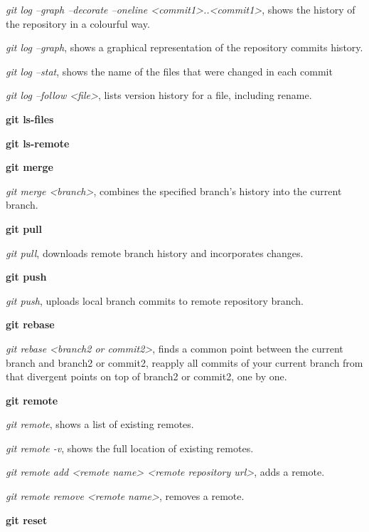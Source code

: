 \begin{refsection}
\noindent\emph{git log --graph --decorate --oneline <commit1>..<commit1>}, shows the history of the repository in a colourful way.

\noindent\emph{git log --graph}, shows a graphical representation of the repository commits history.

\noindent\emph{git log --stat}, shows the name of the files that were changed in each commit

\noindent\emph{git log --follow <file>}, lists version history for a file, including rename.

\vspace*{5mm} \noindent \textbf{git ls-files}

\vspace*{5mm} \noindent \textbf{git ls-remote}

\vspace*{5mm} \noindent \textbf{git merge}

\noindent\emph{git merge <branch>}, combines the specified branch’s history into the current branch.

\vspace*{5mm} \noindent \textbf{git pull}

\noindent\emph{git pull}, downloads remote branch history and incorporates changes.

\vspace*{5mm} \noindent \textbf{git push}

\noindent\emph{git push}, uploads local branch commits to remote repository branch.

\vspace*{5mm} \noindent \textbf{git rebase}

\noindent\emph{git rebase <branch2 or commit2>}, finds a common point between the current branch and branch2 or commit2, reapply all commits of your current branch from that divergent points on top of branch2 or commit2, one by one.

\vspace*{5mm} \noindent \textbf{git remote}

\noindent\emph{git remote}, shows a list of existing remotes.

\noindent\emph{git remote -v}, shows the full location of existing remotes.

\noindent\emph{git remote add <remote name> <remote repository url>}, adds a remote.

\noindent\emph{git remote remove <remote name>}, removes a remote.

\vspace*{5mm} \noindent \textbf{git reset}


\end{refsection}
